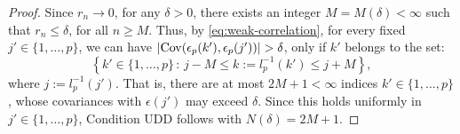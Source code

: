 \begin{proof}%


Since $r_n\to 0$, for any $\delta > 0$, there exists an integer 
$M = M(\delta)<\infty$ such that $r_n\le\delta$, for all $n\ge M$. 
Thus, by \eqref{eq:weak-correlation}, for every fixed 
$j' \in\{1,\ldots,p\}$, we can have $|{\rm {Cov}}(\epsilon_p(k'),\epsilon_p(j'))| > \delta$,
only if $k'$ belongs to the set:
$$ 
 \left\{ k' \in \{1,\dots,p\} \, :\, j-M \le  k := l_p^{-1}(k') \le j+M \right\},
$$
where $j:= l_p^{-1}(j')$. That is, there are at most $2M+1<\infty$ indices  $k'\in\{1,\dots,p\}$, whose covariances with $\epsilon(j')$ may exceed $\delta$. 
Since this holds uniformly in $j'\in\{1,\ldots,p\}$, Condition UDD follows with 
$N(\delta) = 2M+1$.
\end{proof}



% 


